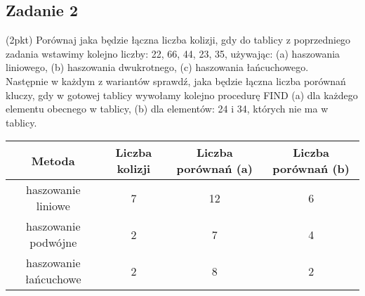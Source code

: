 \documentclass{article}
\begin{document}
\subsection*{Zadanie 2}
(2pkt) Porównaj jaka będzie łączna liczba kolizji, gdy do tablicy z poprzedniego zadania wstawimy kolejno liczby:
22, 66, 44, 23, 35,  używając: (a) haszowania liniowego, (b) haszowania dwukrotnego, (c) haszowania łańcuchowego. \\[1ex]
\noindent
Następnie w każdym z wariantów sprawdź, jaka będzie łączna liczba porównań kluczy, gdy w gotowej tablicy wywołamy
kolejno procedurę FIND (a) dla każdego elementu obecnego w tablicy, (b) dla elementów: 24 i 34, których nie ma w tablicy.
\begin{center}
	\begin{tabular}{c|c|c|c}
		\textbf{Metoda}       & \textbf{Liczba kolizji} & \textbf{Liczba porównań (a)} & \textbf{Liczba porównań (b)} \\
		\hline
		haszowanie liniowe    & 7                       & 12                           & 6                            \\
		haszowanie podwójne   & 2                       & 7                            & 4                            \\
		haszowanie łańcuchowe & 2                       & 8                            & 2
	\end{tabular}
\end{center}

\pagebreak
\end{document}
